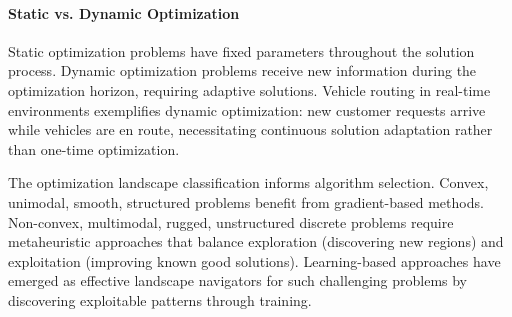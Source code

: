 \paragraph{Static vs. Dynamic Optimization}

Static optimization problems have fixed parameters throughout the solution process. Dynamic optimization problems receive new information during the optimization horizon, requiring adaptive solutions. Vehicle routing in real-time environments exemplifies dynamic optimization: new customer requests arrive while vehicles are en route, necessitating continuous solution adaptation rather than one-time optimization.

The optimization landscape classification informs algorithm selection. Convex, unimodal, smooth, structured problems benefit from gradient-based methods. Non-convex, multimodal, rugged, unstructured discrete problems require metaheuristic approaches that balance exploration (discovering new regions) and exploitation (improving known good solutions). Learning-based approaches have emerged as effective landscape navigators for such challenging problems by discovering exploitable patterns through training.
